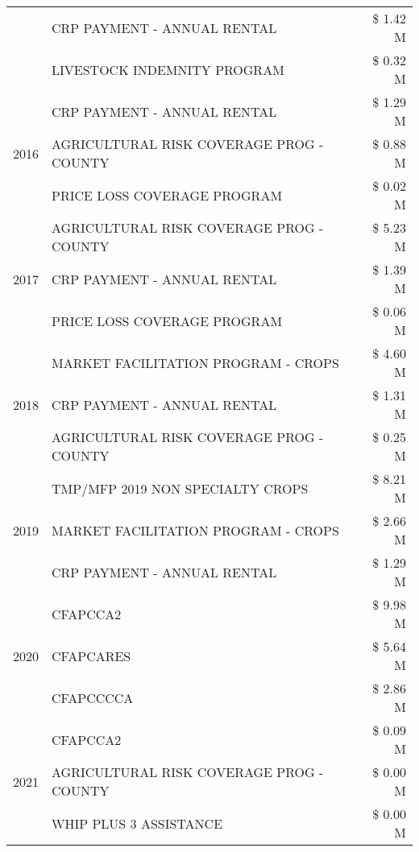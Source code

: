 \begin{tabular}{llr}
 & CRP PAYMENT - ANNUAL RENTAL & \$ 1.42 M \\
 & LIVESTOCK INDEMNITY PROGRAM & \$ 0.32 M \\
\cline{1-3}
\multirow[t]{3}{*}{2016} & CRP PAYMENT - ANNUAL RENTAL & \$ 1.29 M \\
 & AGRICULTURAL RISK COVERAGE PROG - COUNTY & \$ 0.88 M \\
 & PRICE LOSS COVERAGE PROGRAM & \$ 0.02 M \\
\cline{1-3}
\multirow[t]{3}{*}{2017} & AGRICULTURAL RISK COVERAGE PROG - COUNTY & \$ 5.23 M \\
 & CRP PAYMENT - ANNUAL RENTAL & \$ 1.39 M \\
 & PRICE LOSS COVERAGE PROGRAM & \$ 0.06 M \\
\cline{1-3}
\multirow[t]{3}{*}{2018} & MARKET FACILITATION PROGRAM - CROPS & \$ 4.60 M \\
 & CRP PAYMENT - ANNUAL RENTAL & \$ 1.31 M \\
 & AGRICULTURAL RISK COVERAGE PROG - COUNTY & \$ 0.25 M \\
\cline{1-3}
\multirow[t]{3}{*}{2019} & TMP/MFP 2019 NON SPECIALTY CROPS & \$ 8.21 M \\
 & MARKET FACILITATION PROGRAM - CROPS & \$ 2.66 M \\
 & CRP PAYMENT - ANNUAL RENTAL & \$ 1.29 M \\
\cline{1-3}
\multirow[t]{3}{*}{2020} & CFAPCCA2 & \$ 9.98 M \\
 & CFAPCARES & \$ 5.64 M \\
 & CFAPCCCCA & \$ 2.86 M \\
\cline{1-3}
\multirow[t]{3}{*}{2021} & CFAPCCA2 & \$ 0.09 M \\
 & AGRICULTURAL RISK COVERAGE PROG - COUNTY & \$ 0.00 M \\
 & WHIP PLUS 3 ASSISTANCE & \$ 0.00 M \\
\cline{1-3}
\bottomrule
\end{tabular}
